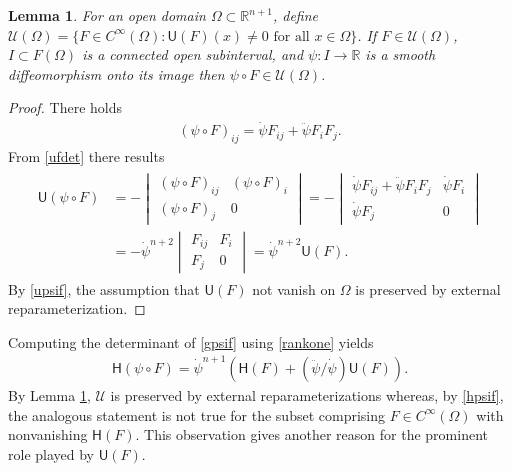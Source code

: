 \documentclass [leqno, 10pt]{amsart}
\newtheorem{lemma}[theorem]{Lemma}
\theoremstyle{definition}
\numberwithin{equation}{section}
\newcommand{\uinf}{\mathscr{U}}
\newcommand{\Om}{\Omega}
\newcommand{\U}{\mathsf{U}}
\renewcommand{\H}{\mathsf{H}}
\newcommand{\cinf}{C^{\infty}}
\newcommand{\rea}{\mathbb R}
\begin{document}
\begin{lemma}\label{uinflemma}
For an open domain $\Om \subset \rea^{n+1}$, define $\uinf(\Om) = \{F \in \cinf(\Om): \U(F)(x) \neq 0 \,\,\text{for all}\,\, x \in \Om\}$. If $F \in \uinf(\Om)$, $I \subset F(\Om)$ is a connected open subinterval, and $\psi:I \to \rea$ is a smooth diffeomorphism onto its image then $\psi \circ F \in \uinf(\Om)$.
\end{lemma}
\begin{proof}
There holds
\begin{align}\label{gpsif}
(\psi \circ F)_{ij} = \dot{\psi}F_{ij} + \ddot{\psi}F_{i}F_{j}. 
\end{align}
From \eqref{ufdet} there results
\begin{align}\label{upsif}
\begin{split}
\U(\psi \circ F) &= -\begin{vmatrix} (\psi \circ F)_{ij} & (\psi \circ F)_{i} \\ (\psi \circ F)_{j} & 0 \end{vmatrix}  = -\begin{vmatrix} \dot{\psi}F_{ij} + \ddot{\psi}F_{i}F_{j}  & \dot{\psi}F_{i} \\ \dot{\psi}F_{j} & 0 \end{vmatrix} \\
& =  -\dot{\psi}^{n+2}\begin{vmatrix} F_{ij}  & F_{i} \\ F_{j} & 0 \end{vmatrix} = \dot{\psi}^{n+2}\U(F).
\end{split}
\end{align}
By \eqref{upsif}, the assumption that $\U(F)$ not vanish on $\Om$ is preserved by external reparameterization.
\end{proof}

\begin{remark}
Computing the determinant of \eqref{gpsif} using \eqref{rankone} yields
\begin{align}\label{hpsif}
\H(\psi \circ F) = \dot{\psi}^{n+1}(\H(F) + (\ddot{\psi}/ \dot{\psi})\U(F)).
\end{align}
By Lemma \ref{uinflemma}, $\uinf$ is preserved by external reparameterizations whereas, by \eqref{hpsif}, the analogous statement is not true for the subset comprising $F \in \cinf(\Om)$ with nonvanishing $\H(F)$. This observation gives another reason for the prominent role played by $\U(F)$.
\end{remark}
\end{document}
